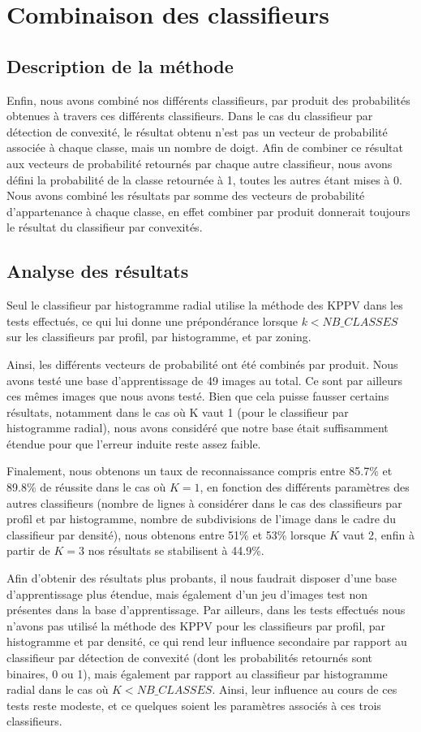 \section{Combinaison des classifieurs}
\subsection{Description de la méthode}
Enfin, nous avons combiné nos différents classifieurs, par produit des probabilités obtenues à travers ces différents classifieurs. Dans le cas du classifieur par détection de convexité, le résultat obtenu n’est pas un vecteur de probabilité associée à chaque classe, mais un nombre de doigt. Afin de combiner ce résultat aux vecteurs de probabilité retournés par chaque autre classifieur, nous avons défini la probabilité de la classe retournée à 1, toutes les autres étant mises à 0. Nous avons combiné les résultats par somme des vecteurs de probabilité d'appartenance à chaque classe, en effet combiner par produit donnerait toujours le résultat du classifieur par convexités.

\subsection{Analyse des résultats}
Seul le classifieur par histogramme radial utilise la méthode des KPPV dans les tests effectués, ce qui lui donne une prépondérance lorsque $k < NB\_CLASSES$ sur les classifieurs par profil, par histogramme, et par zoning.

Ainsi, les différents vecteurs de probabilité ont été combinés par produit. Nous avons testé une base d’apprentissage de 49 images au total. Ce sont par ailleurs ces mêmes images que nous avons testé. Bien que cela puisse fausser certains résultats, notamment dans le cas où K vaut 1 (pour le classifieur par histogramme radial), nous avons considéré que notre base était suffisamment étendue pour que l’erreur induite reste assez faible.

Finalement, nous obtenons un taux de reconnaissance compris entre 85.7\% et 89.8\% de réussite dans le cas où $K = 1$, en fonction des différents paramètres des autres classifieurs (nombre de lignes à considérer dans le cas des classifieurs par profil et par histogramme, nombre de subdivisions de l’image dans le cadre du classifieur par densité), nous obtenons entre 51\% et 53\% lorsque $K$ vaut 2, enfin à partir de $K = 3$ nos résultats se stabilisent à 44.9\%.

Afin d’obtenir des résultats plus probants, il nous faudrait disposer d’une base d’apprentissage plus étendue, mais également d’un jeu d’images test non présentes dans la base d’apprentissage. Par ailleurs, dans les tests effectués nous n’avons pas utilisé la méthode des KPPV pour les classifieurs par profil, par histogramme et par densité, ce qui rend leur influence secondaire par rapport au classifieur par détection de convexité (dont les probabilités retournés sont binaires, 0 ou 1), mais également par rapport au classifieur par histogramme radial dans le cas où $K < NB\_CLASSES$. Ainsi, leur influence au cours de ces tests reste modeste, et ce quelques soient les paramètres associés à ces trois classifieurs.